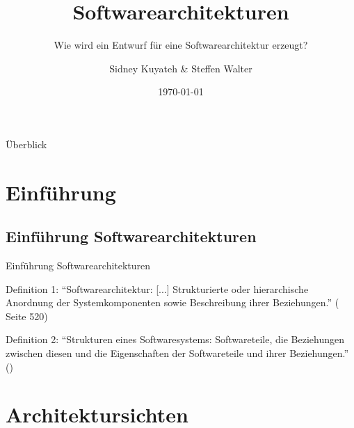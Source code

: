 \documentclass{beamer}
\title{Softwarearchitekturen}
\subtitle{Wie wird ein Entwurf für eine Softwarearchitektur erzeugt?}
\author{Sidney Kuyateh \& Steffen Walter}
\institute{Duale Hochschule Baden-Württemberg}
\date{\today}
\begin{document}
	\maketitle
	\begin{frame}[allowframebreaks]{Überblick}
			\tableofcontents[sectionstyle=show, subsectionstyle=show/shaded,]
	\end{frame}
		\section{Einführung}
		\subsection{Einführung Softwarearchitekturen}
		\begin{frame}{Einführung Softwarearchitekturen}
			\begin{block}{Definition 1:}
				\enquote{Softwarearchitektur: [...] Strukturierte oder hierarchische Anordnung der Systemkomponenten sowie Beschreibung ihrer Beziehungen.} (\cite{balzert} Seite 520)
			\end{block}
			\begin{block}{Definition 2:}
				\enquote{Strukturen eines Softwaresystems: Softwareteile, die Beziehungen zwischen diesen und die Eigenschaften der Softwareteile und ihrer Beziehungen.} (\cite{clements})
			\end{block}
		\end{frame}
		\section{Architektursichten}
\end{document}
